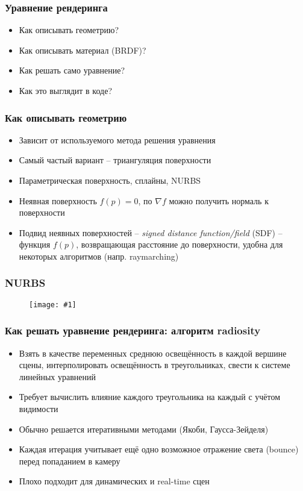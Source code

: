 \documentclass{beamer}
\newcommand{\slideimage}[1]{
  \begin{figure}
    \begin{adjustbox}{width=\textwidth, totalheight=\textheight-2\baselineskip-2\baselineskip,keepaspectratio}
      \texttt{[image: \#1]}
    \end{adjustbox}
  \end{figure}
}
\begin{document}
\begin{frame}[fragile]
\frametitle{Уравнение рендеринга}
\begin{itemize}
\item Как описывать геометрию?
\pause
\item Как описывать материал (BRDF)?
\pause
\item Как решать само уравнение?
\pause
\item Как это выглядит в коде?
\end{itemize}
\end{frame}

\begin{frame}[fragile]
\frametitle{Как описывать геометрию}
\begin{itemize}
\item Зависит от используемого метода решения уравнения
\pause
\item Самый частый вариант -- триангуляция поверхности
\pause
\item Параметрическая поверхность, сплайны, NURBS
\pause
\item Неявная поверхность \begin{math}f(p) = 0\end{math}, по \begin{math}\nabla f\end{math} можно получить нормаль к поверхности
\pause
\item Подвид неявных поверхностей -- \textit{signed distance function/field} (SDF) -- функция \begin{math}f(p)\end{math}, возвращающая расстояние до поверхности, удобна для некоторых алгоритмов (напр. raymarching)
\end{itemize}
\end{frame}

\begin{frame}[fragile]
\frametitle{NURBS}
\slideimage{nurbs.png}
\end{frame}

\begin{frame}[fragile]
\frametitle{Как решать уравнение рендеринга: алгоритм radiosity}
\begin{itemize}
\item Взять в качестве переменных среднюю освещённость в каждой вершине сцены, интерполировать освещённость в треугольниках, свести к системе линейных уравнений
\pause
\item Требует вычислить влияние каждого треугольника на каждый с учётом видимости
\pause
\item Обычно решается итеративными методами (Якоби, Гаусса-Зейделя)
\pause
\item Каждая итерация учитывает ещё одно возможное отражение света (bounce) перед попаданием в камеру
\pause
\item Плохо подходит для динамических и real-time сцен
\end{itemize}
\end{frame}
\end{document}
